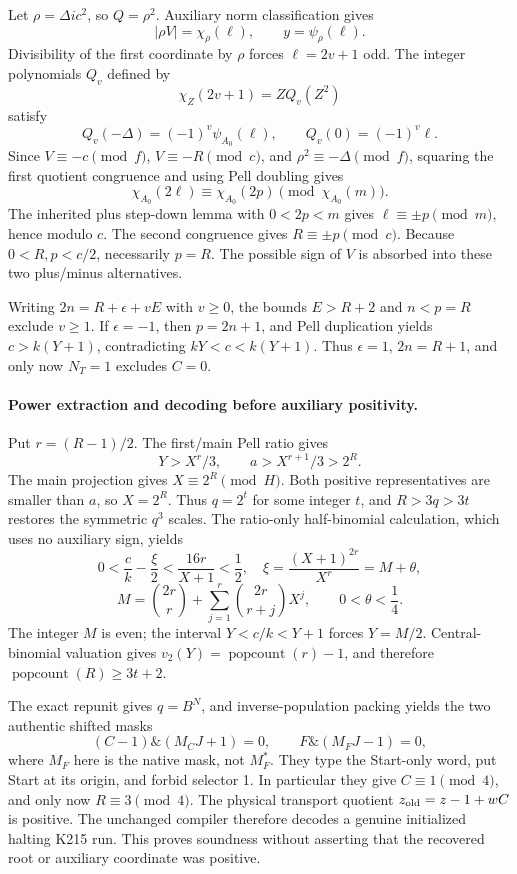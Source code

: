 \documentclass[11pt]{article}
\newcommand{\pc}{\operatorname{popcount}}
\begin{document}
Let $\rho=\Delta ic^2$, so $Q=\rho^2$. Auxiliary norm classification gives
\[
|\rho V|=\chi_\rho(\ell),\qquad y=\psi_\rho(\ell).
\]
Divisibility of the first coordinate by $\rho$ forces $\ell=2v+1$ odd. The integer polynomials $Q_v$ defined by
\[
\chi_Z(2v+1)=ZQ_v(Z^2)
\]
satisfy
\[
Q_v(-\Delta)=(-1)^v\psi_{A_0}(\ell),\qquad
Q_v(0)=(-1)^v\ell.
\]
Since $V\equiv-c\pmod f$, $V\equiv-R\pmod c$, and
$\rho^2\equiv-\Delta\pmod f$, squaring the first quotient congruence and using Pell doubling gives
\[
\chi_{A_0}(2\ell)\equiv\chi_{A_0}(2p)\pmod{\chi_{A_0}(m)}.
\]
The inherited plus step-down lemma with $0<2p<m$ gives
$\ell\equiv\pm p\pmod m$, hence modulo $c$. The second congruence gives
$R\equiv\pm p\pmod c$. Because $0<R,p<c/2$, necessarily $p=R$.
The possible sign of $V$ is absorbed into these two plus/minus alternatives.

Writing $2n=R+\epsilon+vE$ with $v\geq0$, the bounds $E>R+2$ and $n<p=R$ exclude $v\geq1$. If $\epsilon=-1$, then $p=2n+1$, and Pell duplication yields $c>k(Y+1)$, contradicting $kY<c<k(Y+1)$. Thus $\epsilon=1$, $2n=R+1$, and only now $N_T=1$ excludes $C=0$.

\paragraph{Power extraction and decoding before auxiliary positivity.}
Put $r=(R-1)/2$. The first/main Pell ratio gives
\[
Y>X^r/3,\qquad a>X^{r+1}/3>2^R.
\]
The main projection gives $X\equiv2^R\pmod H$. Both positive representatives are smaller than $a$, so $X=2^R$.
Thus $q=2^t$ for some integer $t$, and $R>3q>3t$ restores the symmetric $q^3$ scales. The ratio-only half-binomial calculation, which uses no auxiliary sign, yields
\[
0<\frac ck-\frac\xi2<\frac{16r}{X+1}<\frac12,
\quad \xi=\frac{(X+1)^{2r}}{X^r}=M+\theta,
\]
\[
M=\binom{2r}{r}+\sum_{j=1}^r\binom{2r}{r+j}X^j,
\qquad 0<\theta<\frac14.
\]
The integer $M$ is even; the interval $Y<c/k<Y+1$ forces $Y=M/2$.
Central-binomial valuation gives $v_2(Y)=\pc(r)-1$, and therefore
$\pc(R)\geq3t+2$.

The exact repunit gives $q=B^N$, and inverse-population packing yields the two authentic shifted masks
\[
(C-1)\mathbin{\&}(M_CJ+1)=0,\qquad
F\mathbin{\&}(M_FJ-1)=0,
\]
where $M_F$ here is the native mask, not $M_F^*$. They type the Start-only word, put Start at its origin, and forbid selector 1. In particular they give $C\equiv1\pmod4$, and only now $R\equiv3\pmod4$.
The physical transport quotient $z_{\rm old}=z-1+wC$ is positive. The unchanged compiler therefore decodes a genuine initialized halting K215 run. This proves soundness without asserting that the recovered root or auxiliary coordinate was positive.
\end{document}
